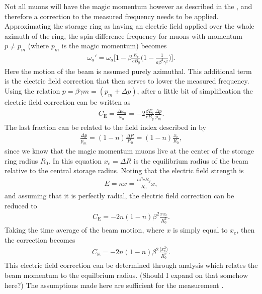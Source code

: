Not all muons will have the magic momentum however as described in the , and therefore a correction to the measured \wa frequency needs to be applied. Approximating the storage ring as having an electric field applied over the whole azimuth of the ring, the spin difference frequency for muons with momentum $p \neq p_{m}$ (where $p_{m}$ is the magic momentum) becomes  
        \begin{align} \label{eq:waEfield}
            \omega_{a}' = \omega_{a} \Big[ 1 - \beta \frac{E_{r}}{c B_{y}} \Big( 1 - \frac{1}{a \beta^{2} \gamma^{2}} \Big) \Big].
        \end{align}
Here the motion of the beam is assumed purely azimuthal. This additional term is the electric field correction that then serves to lower the measured \wa frequency. Using the relation $p = \beta \gamma m = (p_{m} + \Delta p)$, after a little bit of simplification the electric field correction can be written as
        \begin{align}
            C_{\text{E}} = \frac{\Delta\omega_{a}}{\omega_{a}} = -2 \frac{\beta E_{r}}{c B_{y}} \frac{\Delta p}{p_{m}}.
        \end{align}
The last fraction can be related to the field index described in  by
        \begin{align}
            \frac{\Delta p}{p_{m}} = (1-n) \frac{\Delta R}{R_{0}} = (1-n) \frac{x_{e}}{R_{0}}, 
        \end{align}
since we know that the magic momentum muons live at the center of the storage ring radius $R_{0}$. In this equation $x_{e} = \Delta R$ is the equilibrium radius of the beam relative to the central storage radius. Noting that the electric field strength is 
        \begin{align}
            E = \kappa x = \frac{n \beta c B_{y}}{R_{0}} x,
        \end{align}
and assuming that it is perfectly radial, the electric field correction can be reduced to 
        \begin{align}
            C_{\text{E}} = -2n (1-n) \beta^{2} \frac{x x_{e}}{R_{0}^{2}}.
        \end{align}
Taking the time average of the beam motion, where $x$ is simply equal to $x_{e}$, then the correction becomes
        \begin{align}
            C_{\text{E}} = -2n (1-n) \beta^{2} \frac{\langle x_{e}^{2} \rangle}{R_{0}^{2}}.
        \end{align}
This electric field correction can be determined through analysis which relates the beam momentum to the equilbrium radius. (Should I expand on that somehow here?) The assumptions made here are sufficient for the \gmtwo measurement \cite{something}.


